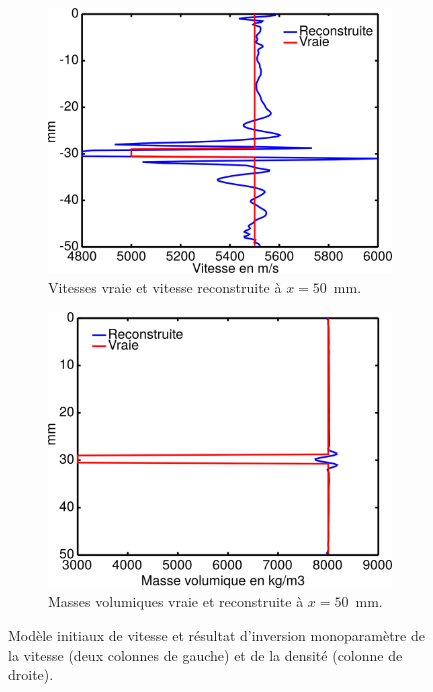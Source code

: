 \begin{figure}[p]
\begin{changemargin}{-2cm}{-2cm}
\begin{subfigure}[b]{0.29\textwidth}
			\includegraphics[width=\textwidth]{img/mono_param/coupe_vp_mono_smooth_vert.png}
			\caption{Vitesses vraie et vitesse reconstruite à $x=50$~mm.}
		\end{subfigure}
		\begin{subfigure}[b]{0.29\textwidth}
			\includegraphics[width=\textwidth]{img/mono_param/coupe_rho_mono_vert.png}
			\caption{Masses volumiques vraie et reconstruite à $x=50$~mm.}
		\end{subfigure}
		\caption{\label{app:inv_mono} Modèle initiaux de vitesse et résultat d'inversion monoparamètre de la vitesse (deux colonnes de gauche) et de la densité (colonne de droite).}
	\end{changemargin}
	\end{figure}

